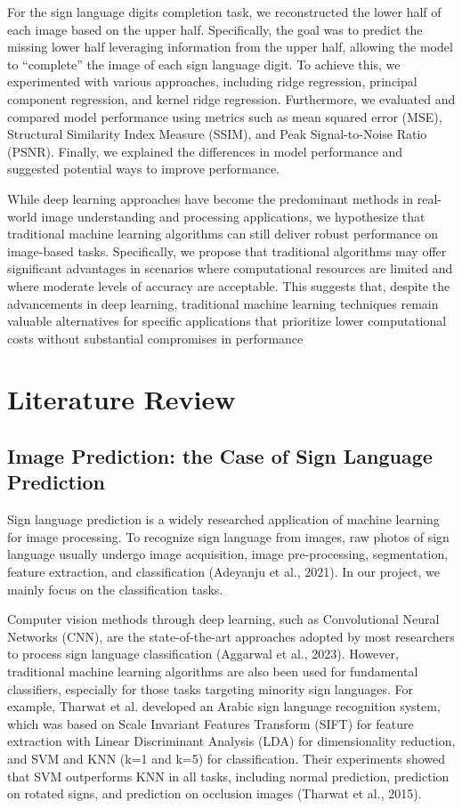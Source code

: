 \documentclass{article}
\begin{document}
For the sign language digits completion task, we reconstructed the lower half of each image based on the upper half. Specifically, the goal was to predict the missing lower half leveraging information from the upper half, allowing the model to “complete” the image of each sign language digit. To achieve this, we experimented with various approaches, including ridge regression, principal component regression, and kernel ridge regression. Furthermore, we evaluated and compared model performance using metrics such as mean squared error (MSE), Structural Similarity Index Measure (SSIM), and Peak Signal-to-Noise Ratio (PSNR). Finally, we explained the differences in model performance and suggested potential ways to improve performance.

While deep learning approaches have become the predominant methods in real-world image understanding and processing applications, we hypothesize that traditional machine learning algorithms can still deliver robust performance on image-based tasks. Specifically, we propose that traditional algorithms may offer significant advantages in scenarios where computational resources are limited and where moderate levels of accuracy are acceptable. This suggests that, despite the advancements in deep learning, traditional machine learning techniques remain valuable alternatives for specific applications that prioritize lower computational costs without substantial compromises in performance

\section{Literature Review}
\subsection{Image Prediction: the Case of Sign Language Prediction}
Sign language prediction is a widely researched application of machine learning for image processing. To recognize sign language from images, raw photos of sign language usually undergo image acquisition, image pre-processing, segmentation, feature extraction, and classification (Adeyanju et al., 2021). In our project, we mainly focus on the classification tasks.

Computer vision methods through deep learning, such as Convolutional Neural Networks (CNN), are the state-of-the-art approaches adopted by most researchers to process sign language classification (Aggarwal et al., 2023). However, traditional machine learning algorithms are also been used for fundamental classifiers, especially for those tasks targeting minority sign languages. For example, Tharwat et al. developed an Arabic sign language recognition system, which was based on Scale Invariant Features Transform
(SIFT) for feature extraction with Linear Discriminant Analysis (LDA) for dimensionality reduction, and SVM and KNN (k=1 and k=5) for classification. Their experiments showed that SVM outperforms KNN in all tasks, including normal prediction, prediction on rotated signs, and prediction on occlusion images (Tharwat et al., 2015).
\end{document}
